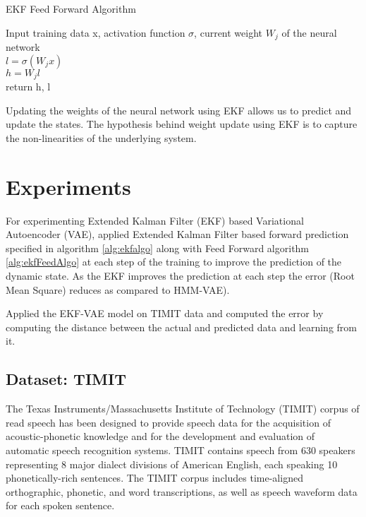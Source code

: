 \documentclass{article}
\begin{document}
\begin{algorithm}[tbh]
   \caption{EKF Feed Forward Algorithm}
   \label{alg:ekfFeedAlgo}
\begin{algorithmic}
    Input training data x, activation function $\sigma$, current weight $W_{j}$ of the neural network \\ 
   \STATE $l = \sigma (W_{j} x) $ \\
   \STATE $ h = W_{j} l$  \\
   \STATE  return h, l
\end{algorithmic}
\end{algorithm} 

Updating the weights of the neural network using EKF allows us to predict and update the states. The hypothesis behind weight update using EKF is to capture the non-linearities of the underlying system.

\section{Experiments}
\label{section:experiments}
For experimenting Extended Kalman Filter (EKF) based Variational Autoencoder (VAE), applied Extended Kalman Filter based forward prediction specified in algorithm \ref{alg:ekfalgo} along with Feed Forward algorithm \ref{alg:ekfFeedAlgo} at each step of the training to improve the prediction of the dynamic state. As the EKF improves the prediction at each step the error (Root Mean Square) reduces as compared to HMM-VAE).
 
Applied the EKF-VAE model on TIMIT \cite{timit-article} data and computed the error by computing the distance between the actual and predicted data and learning from it.

\subsection{Dataset: TIMIT}
The Texas Instruments/Massachusetts Institute of Technology (TIMIT) \cite{timit-article} corpus of read
speech has been designed to provide speech data for the acquisition of acoustic-phonetic knowledge and for the development and evaluation of automatic speech recognition systems. TIMIT contains speech from 630 speakers representing 8 major dialect divisions of American English, each speaking 10 phonetically-rich sentences. The TIMIT corpus includes time-aligned orthographic, phonetic, and word transcriptions, as well as speech waveform data for each spoken sentence.
\end{document}

